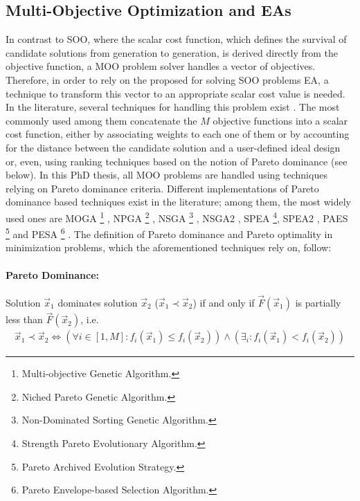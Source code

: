 \subsection{Multi-Objective Optimization and EAs}
\label{MOOini}
In contrast to SOO, where the scalar cost function, which defines the survival of candidate solutions from generation to generation, is derived directly from the objective function, a MOO problem solver handles a vector of objectives. Therefore, in order to rely on the proposed for solving SOO problems EA, a technique to transform this vector to an appropriate scalar cost value is needed. In the literature, several techniques for handling this problem exist \cite{CoCo99,coe02,Miett99}. The most commonly used among them concatenate the $M$ objective functions into a scalar cost function, either by associating weights to each one of them or by accounting for the distance between the candidate solution and a user-defined ideal design or, even, using ranking techniques based on the notion of Pareto dominance (see below). In this PhD thesis, all MOO problems are handled using techniques relying on Pareto dominance criteria. Different implementations of Pareto dominance based techniques exist in the literature; among them, the most widely used ones are MOGA \footnote{Multi-objective Genetic Algorithm.} \cite{Fon93}, NPGA \footnote{Niched Pareto Genetic Algorithm.} \cite{horn94}, NSGA \footnote{Non-Dominated Sorting Genetic Algorithm.} \cite{Sri1995}, NSGA2 \cite{Deb00a}, SPEA \footnote{Strength Pareto Evolutionary Algorithm.}\cite{ZiTh98}, SPEA2 \cite{Zitz02,Zitz01}, PAES \footnote{Pareto Archived Evolution Strategy.} \cite{knowles99} and PESA \footnote{Pareto Envelope-based Selection Algorithm.} \cite{corne00}. The definition of Pareto dominance and Pareto optimality in minimization problems, which the aforementioned techniques rely on, follow:

\paragraph{Pareto Dominance:} Solution $\vec{x}_1$ dominates solution $\vec{x}_2$ ($\vec{x}_1\prec\vec{x}_2$) if and only if $\vec{F}(\vec{x}_1)$ is partially less than $\vec{F}(\vec{x}_2)$, i.e.
\begin{eqnarray}
    \vec{x}_1\prec\vec{x}_2 \Leftrightarrow (\forall i \in[1,M] :  f_i(\vec{x}_1) \leq f_i(\vec{x}_2))\wedge (\exists _i : f_i(\vec{x}_1) < f_i(\vec{x}_2))
   \label{pareto_eq} 
\end{eqnarray}

